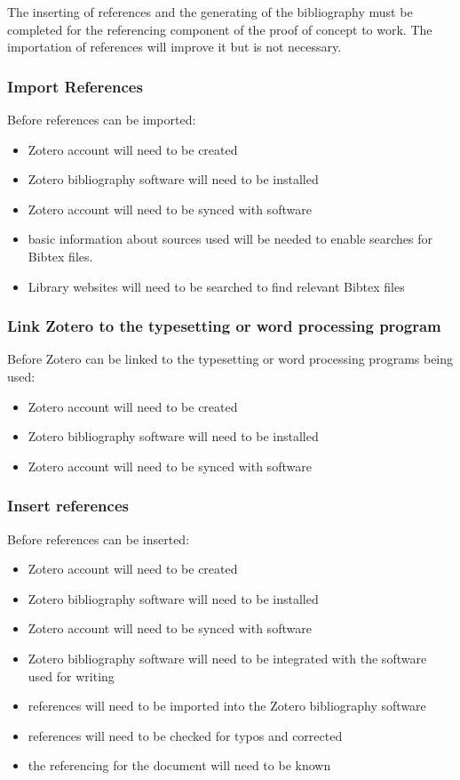 \documentclass{article}
\begin{document}
The inserting of references and the generating of the bibliography must be completed for the referencing component of the proof of concept to work. The importation of references will improve it but is not necessary.

\subsubsection*{Import References}

Before references can be imported:
\begin{itemize}
\item Zotero account will need to be created
    \item Zotero bibliography software will need to be installed
    \item Zotero account will need to be synced with software
    \item basic information about sources used will be needed to enable searches for Bibtex files.
    \item Library websites will need to be searched to find relevant Bibtex files
\end{itemize}

\subsubsection*{Link Zotero to the typesetting or word processing program}

Before Zotero can be linked to the typesetting or word processing programs being used:
\begin{itemize}
\item Zotero account will need to be created
    \item Zotero bibliography software will need to be installed
    \item Zotero account will need to be synced with software
\end{itemize}

\subsubsection*{Insert references}

Before references can be inserted:
\begin{itemize}
\item Zotero account will need to be created
    \item Zotero bibliography software will need to be installed
    \item Zotero account will need to be synced with software
    \item Zotero bibliography software will need to be integrated with the software used for writing
    \item references will need to be imported into the Zotero bibliography software
    \item references will need to be checked for typos and corrected
    \item the referencing for the document will need to be known
\end{itemize}
\end{document}
